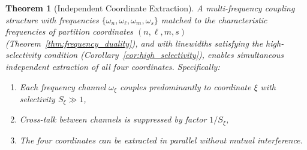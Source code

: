 \documentclass[twocolumn,10pt,a4paper]{article}
\newtheorem{theorem}{Theorem}[section]
\theoremstyle{remark}
\begin{document}
\begin{theorem}[Independent Coordinate Extraction]
\label{thm:independent_extraction}
A multi-frequency coupling structure with frequencies $\{\omega_n, \omega_\ell, \omega_m, \omega_s\}$ matched to the characteristic frequencies of partition coordinates $(n, \ell, m, s)$ (Theorem~\ref{thm:frequency_duality}), and with linewidths satisfying the high-selectivity condition (Corollary~\ref{cor:high_selectivity}), enables simultaneous independent extraction of all four coordinates. Specifically:
\begin{enumerate}[label=(\roman*), noitemsep]
    \item Each frequency channel $\omega_\xi$ couples predominantly to coordinate $\xi$ with selectivity $S_\xi \gg 1$,
    \item Cross-talk between channels is suppressed by factor $1/S_\xi$,
    \item The four coordinates can be extracted in parallel without mutual interference.
\end{enumerate}
\end{theorem}
\end{document}
